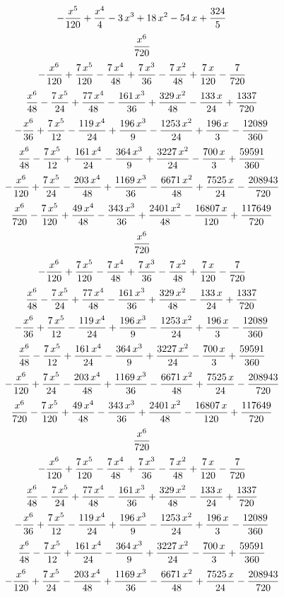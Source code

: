 $$-{{x^5}\over{120}}+{{x^4}\over{4}}-3\,x^3+18\,x^2-54\,x+{{324
 }\over{5}}$$
$${{x^6}\over{720}}$$
$$-{{x^6}\over{120}}+{{7\,x^5}\over{120}}-{{7\,x^4}\over{48}}+{{7\,x^
 3}\over{36}}-{{7\,x^2}\over{48}}+{{7\,x}\over{120}}-{{7}\over{720}}$$
$${{x^6}\over{48}}-{{7\,x^5}\over{24}}+{{77\,x^4}\over{48}}-{{161\,x^
 3}\over{36}}+{{329\,x^2}\over{48}}-{{133\,x}\over{24}}+{{1337}\over{
 720}}$$
$$-{{x^6}\over{36}}+{{7\,x^5}\over{12}}-{{119\,x^4}\over{24}}+{{196\,
 x^3}\over{9}}-{{1253\,x^2}\over{24}}+{{196\,x}\over{3}}-{{12089
 }\over{360}}$$
$${{x^6}\over{48}}-{{7\,x^5}\over{12}}+{{161\,x^4}\over{24}}-{{364\,x
 ^3}\over{9}}+{{3227\,x^2}\over{24}}-{{700\,x}\over{3}}+{{59591
 }\over{360}}$$
$$-{{x^6}\over{120}}+{{7\,x^5}\over{24}}-{{203\,x^4}\over{48}}+{{1169
 \,x^3}\over{36}}-{{6671\,x^2}\over{48}}+{{7525\,x}\over{24}}-{{
 208943}\over{720}}$$
$${{x^6}\over{720}}-{{7\,x^5}\over{120}}+{{49\,x^4}\over{48}}-{{343\,
 x^3}\over{36}}+{{2401\,x^2}\over{48}}-{{16807\,x}\over{120}}+{{
 117649}\over{720}}$$
$${{x^6}\over{720}}$$
$$-{{x^6}\over{120}}+{{7\,x^5}\over{120}}-{{7\,x^4}\over{48}}+{{7\,x^
 3}\over{36}}-{{7\,x^2}\over{48}}+{{7\,x}\over{120}}-{{7}\over{720}}$$
$${{x^6}\over{48}}-{{7\,x^5}\over{24}}+{{77\,x^4}\over{48}}-{{161\,x^
 3}\over{36}}+{{329\,x^2}\over{48}}-{{133\,x}\over{24}}+{{1337}\over{
 720}}$$
$$-{{x^6}\over{36}}+{{7\,x^5}\over{12}}-{{119\,x^4}\over{24}}+{{196\,
 x^3}\over{9}}-{{1253\,x^2}\over{24}}+{{196\,x}\over{3}}-{{12089
 }\over{360}}$$
$${{x^6}\over{48}}-{{7\,x^5}\over{12}}+{{161\,x^4}\over{24}}-{{364\,x
 ^3}\over{9}}+{{3227\,x^2}\over{24}}-{{700\,x}\over{3}}+{{59591
 }\over{360}}$$
$$-{{x^6}\over{120}}+{{7\,x^5}\over{24}}-{{203\,x^4}\over{48}}+{{1169
 \,x^3}\over{36}}-{{6671\,x^2}\over{48}}+{{7525\,x}\over{24}}-{{
 208943}\over{720}}$$
$${{x^6}\over{720}}-{{7\,x^5}\over{120}}+{{49\,x^4}\over{48}}-{{343\,
 x^3}\over{36}}+{{2401\,x^2}\over{48}}-{{16807\,x}\over{120}}+{{
 117649}\over{720}}$$
$${{x^6}\over{720}}$$
$$-{{x^6}\over{120}}+{{7\,x^5}\over{120}}-{{7\,x^4}\over{48}}+{{7\,x^
 3}\over{36}}-{{7\,x^2}\over{48}}+{{7\,x}\over{120}}-{{7}\over{720}}$$
$${{x^6}\over{48}}-{{7\,x^5}\over{24}}+{{77\,x^4}\over{48}}-{{161\,x^
 3}\over{36}}+{{329\,x^2}\over{48}}-{{133\,x}\over{24}}+{{1337}\over{
 720}}$$
$$-{{x^6}\over{36}}+{{7\,x^5}\over{12}}-{{119\,x^4}\over{24}}+{{196\,
 x^3}\over{9}}-{{1253\,x^2}\over{24}}+{{196\,x}\over{3}}-{{12089
 }\over{360}}$$
$${{x^6}\over{48}}-{{7\,x^5}\over{12}}+{{161\,x^4}\over{24}}-{{364\,x
 ^3}\over{9}}+{{3227\,x^2}\over{24}}-{{700\,x}\over{3}}+{{59591
 }\over{360}}$$
$$-{{x^6}\over{120}}+{{7\,x^5}\over{24}}-{{203\,x^4}\over{48}}+{{1169
 \,x^3}\over{36}}-{{6671\,x^2}\over{48}}+{{7525\,x}\over{24}}-{{
 208943}\over{720}}$$
